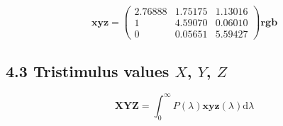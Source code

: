 \documentclass [a4paper,fleqn] {jarticle}
\newcommand\V[1]{\ensuremath {\boldsymbol {#1}}}
\begin{document}
\[ \V{xyz} =
   \begin {pmatrix}
     2.76888 & 1.75175 & 1.13016 \\
     1       & 4.59070 & 0.06010 \\
     0       & 0.05651 & 5.59427
   \end {pmatrix} \V{rgb} \]

\subsection* {4.3 Tristimulus values $X$, $Y$, $Z$}

\[ \V{XYZ} = \int_0^\infty P(\lambda)\V {xyz}(\lambda) \mathrm {d}\lambda \]
\end{document}
